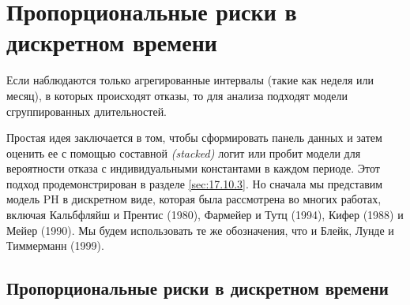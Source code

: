 \section{Пропорциональные риски в дискретном времени}\label{sec:17.10}

\noindent
Если наблюдаются только агрегированные интервалы (такие как неделя или месяц), в которых происходят отказы, то для анализа подходят модели сгруппированных длительностей.

Простая идея заключается в том, чтобы сформировать панель данных и затем оценить ее с помощью составной \textit{(stacked)} логит или пробит модели для вероятности отказа с индивидуальными константами в каждом периоде. Этот подход продемонстрирован в разделе \ref{sec:17.10.3}. Но сначала мы представим модель PH в дискретном виде, которая была рассмотрена во многих работах, включая Кальбфляйш и Прентис (1980), Фармейер и Тутц (1994), Кифер (1988) и Мейер (1990). Мы будем использовать те же обозначения, что и Блейк, Лунде и Тиммерманн (1999).


\subsection{Пропорциональные риски в дискретном времени}\label{sec:17.10.1}

